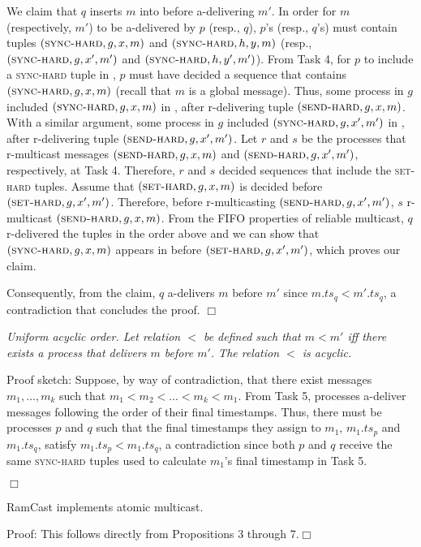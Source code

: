 We claim that $q$ inserts $m$ into \Buffer before a-delivering $m'$. 
In order for $m$ (respectively, $m'$) to be a-delivered by $p$ (resp., $q$), $p$'s (resp., $q$'s) \Buffer must contain tuples $(\textsc{sync-hard}, g, x, m)$ and $(\textsc{sync-hard}, h, y, m)$ (resp., $(\textsc{sync-hard}, g, x', m')$ and $(\textsc{sync-hard}, h, y', m')$).
From Task 4, for $p$ to include a \textsc{sync-hard} tuple in \Buffer, $p$ must have decided a sequence that contains $(\textsc{sync-hard}, g, x, m)$ (recall that $m$ is a global message).
Thus, some process in $g$ included $(\textsc{sync-hard}, g, x, m)$ in \Pend, after r-delivering tuple  $(\textsc{send-hard}, g, x, m)$.
With a similar argument, some process in $g$ included $(\textsc{sync-hard}, g, x', m')$ in \Pend, after r-delivering tuple $(\textsc{send-hard}, g, x', m')$.
Let $r$ and $s$ be the processes that r-multicast messages $(\textsc{send-hard}, g, x, m)$ and $(\textsc{send-hard}, g, x', m')$, respectively, at Task 4.
Therefore, $r$ and $s$ decided sequences that include the \textsc{set-hard} tuples.
Assume that $(\textsc{set-hard}, g, x, m)$ is decided before $(\textsc{set-hard}, g, x', m')$.
Therefore, before r-multicasting $(\textsc{send-hard}, g, x', m')$, $s$ r-multicast $(\textsc{send-hard}, g, x, m)$.
From the FIFO properties of reliable multicast, $q$ r-delivered the tuples in the order above and we can show that $(\textsc{sync-hard}, g, x, m)$ appears in \Buffer before $(\textsc{set-hard}, g, x', m')$, which proves our claim.

Consequently, from the claim, $q$ a-delivers $m$ before $m'$ since $m.ts_q < m'.ts_q$, a contradiction that concludes the proof.
\hfill$\Box$

\begin{proposition}
\textit{Uniform acyclic order.
Let relation $<$ be defined such that $m < m'$ iff there exists a process that delivers $m$ before $m'$.
The relation $<$ is acyclic.}
\end{proposition}
\noindent
{\sc Proof sketch:} 
Suppose, by way of contradiction, that there exist messages $m_1, ..., m_k$ such that $m_1 < m_2 < ... < m_k < m_1$. 
From Task 5, processes a-deliver messages following the order of their final timestamps.
Thus, there must be processes $p$ and $q$ such that the final timestamps they assign to $m_1$, $m_1.ts_p$ and  $m_1.ts_q$, satisfy $m_1.ts_p < m_1.ts_q$, a contradiction since both $p$ and $q$ receive the same \textsc{sync-hard} tuples used to calculate $m_1$'s final timestamp in Task 5.


\hfill$\Box$

\begin{theorem}
RamCast implements atomic multicast.
\end{theorem}
\noindent
{\sc Proof:} 
This follows directly from Propositions 3 through 7.\hfill$\Box$


